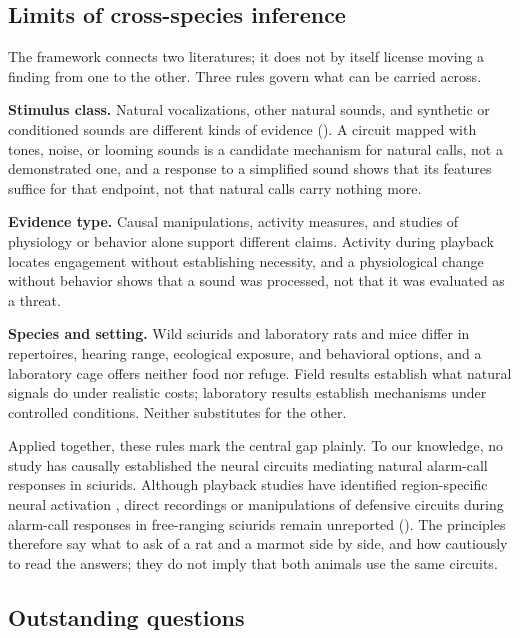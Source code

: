 \subsection{Limits of cross-species inference}
\label{sec:account-limits}

The framework connects two literatures; it does not by itself license moving a finding from one to the other. Three rules govern what can be carried across.

\textbf{Stimulus class.} Natural vocalizations, other natural sounds, and synthetic or conditioned sounds are different kinds of evidence (). A circuit mapped with tones, noise, or looming sounds is a candidate mechanism for natural calls, not a demonstrated one, and a response to a simplified sound shows that its features suffice for that endpoint, not that natural calls carry nothing more.

\textbf{Evidence type.} Causal manipulations, activity measures, and studies of physiology or behavior alone support different claims. Activity during playback locates engagement without establishing necessity, and a physiological change without behavior shows that a sound was processed, not that it was evaluated as a threat.

\textbf{Species and setting.} Wild sciurids and laboratory rats and mice differ in repertoires, hearing range, ecological exposure, and behavioral options, and a laboratory cage offers neither food nor refuge. Field results establish what natural signals do under realistic costs; laboratory results establish mechanisms under controlled conditions. Neither substitutes for the other.

Applied together, these rules mark the central gap plainly. To our knowledge, no study has causally established the neural circuits mediating natural alarm-call responses in sciurids. Although playback studies have identified region-specific neural activation \citep{FreemanEtAl2020}, direct recordings or manipulations of defensive circuits during alarm-call responses in free-ranging sciurids remain unreported (). The principles therefore say what to ask of a rat and a marmot side by side, and how cautiously to read the answers; they do not imply that both animals use the same circuits.

\subsection{Outstanding questions}
\label{sec:outlook}

